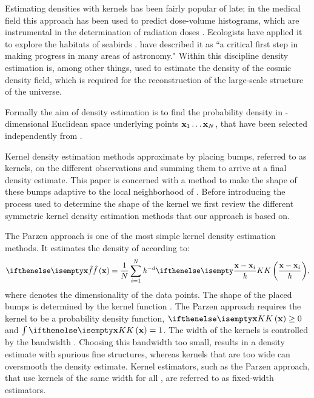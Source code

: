 Estimating densities with kernels has been fairly popular of late; in the medical field this approach has been used to predict dose-volume histograms, which are instrumental in the determination of radiation doses \cite{SkarpmanDose2015}. Ecologists have applied it to explore the habitats of seabirds \cite{lees2016using}. \textcite{ferdosi2011comparison} have described it as ``a critical first step in making progress in many areas of astronomy."  Within this discipline  density estimation is, among other things, used to estimate the density of the cosmic density field, which is required for the reconstruction of the large-scale structure of the universe.

Formally the aim of density estimation is to find the probability density \varDensityFunction{\varPattern} in \varDim-dimensional Euclidean space underlying \varNumPatterns points $\varPattern[1] \dotsc \varPattern[\varNumPatterns]$, that have been selected independently from \varDensityFunction{\varPattern}. 

Kernel density estimation methods approximate \varDensityFunction{\varPattern} by placing bumps, referred to as kernels, on the different observations and summing them to arrive at a final density estimate. This paper is concerned with a method to make the shape of these bumps adaptive to the local neighborhood of \varPattern. Before introducing the process used to determine the shape of the kernel we first review the different symmetric kernel density estimation methods that our approach is based on. 

	The Parzen approach \cite{parzen1962estimation} is one of the most simple kernel density estimation methods. It estimates the density of \varPattern according to:
	\begin{equation}\label{eq:1:parzen}
		\varEstimatedDensityFunction{\varPattern} = \frac{1}{\varNumPatterns}\sum_{\itXis = 1}^{\varNumPatterns} \varBandwidth^{-\varDim}\varKernel{\frac{\varPattern - \varPattern[\itXis]}{\varBandwidth}},
	\end{equation}
	where \varDim denotes the dimensionality of the data points. The shape of the placed bumps is determined by the kernel function \varKernel{}.  The Parzen approach requires the kernel to be a probability density function, \ie $\varKernel{\varPattern} \geq 0$ and $\int \varKernel{\varPattern} = 1$. 
	The width of the kernels is controlled by the bandwidth \varBandwidth \cite{silverman1986density}. Choosing this bandwidth too small, results in a density estimate with spurious fine structures, whereas kernels that are too wide can oversmooth the density estimate. Kernel estimators, such as the Parzen approach, that use kernels of the same width for all \varPattern[j], are referred to as fixed-width estimators.

